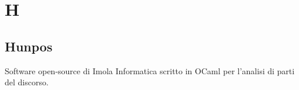 \section{H}	\label{H}

	\subsection{Hunpos}	\label{hunpos}
	Software open-source di Imola Informatica scritto in OCaml per l'analisi di parti del discorso.